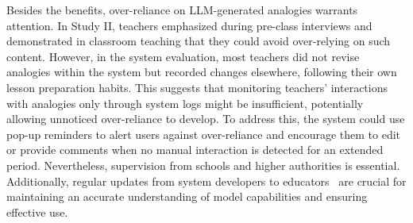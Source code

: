 {%
Besides the benefits, over-reliance on LLM-generated analogies warrants attention. 
In Study II, teachers emphasized during pre-class interviews and demonstrated in classroom teaching that they could avoid over-relying on such content.
However, in the system evaluation, most teachers did not revise analogies within the system but recorded changes elsewhere, following their own lesson preparation habits. 
This suggests that monitoring teachers' interactions with analogies only through system logs might be insufficient, potentially allowing unnoticed over-reliance to develop.
To address this, the system could use pop-up reminders to alert users against over-reliance and encourage them to edit or provide comments when no manual interaction is detected for an extended period.
Nevertheless, supervision from schools and higher authorities is essential. Additionally, regular updates from system developers to educators~\cite{tan_more_2024,kasneci2023chatgpt} are crucial for maintaining an accurate understanding of model capabilities and ensuring effective use.
}

